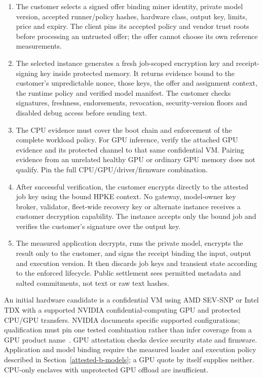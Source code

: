 \begin{enumerate}
\tightlist
\item
  The customer selects a signed offer binding miner identity, private
  model version, accepted runner/policy hashes, hardware class, output
  key, limits, price and expiry. The client pins its accepted policy and
  vendor trust roots before processing an untrusted offer; the offer
  cannot choose its own reference measurements.
\item
  The selected instance generates a fresh job-scoped encryption key and
  receipt-signing key inside protected memory. It returns evidence bound
  to the customer's unpredictable nonce, those keys, the offer and
  assignment context, the runtime policy and verified model manifest.
  The customer checks signatures, freshness, endorsements, revocation,
  security-version floors and disabled debug access before sending text.
\item
  The CPU evidence must cover the boot chain and enforcement of the
  complete workload policy. For GPU inference, verify the attached GPU
  evidence and its protected channel to that same confidential VM.
  Pairing evidence from an unrelated healthy GPU or ordinary GPU memory
  does not qualify. Pin the full CPU/GPU/driver/firmware combination.
\item
  After successful verification, the customer encrypts directly to the
  attested job key using the bound HPKE context. No gateway, model-owner
  key broker, validator, fleet-wide recovery key or alternate instance
  receives a customer decryption capability. The instance accepts only
  the bound job and verifies the customer's signature over the output key.
\item
  The measured application decrypts, runs the private model, encrypts the
  result only to the customer, and signs the receipt binding the input,
  output and execution version. It then discards job keys and transient
  state according to the enforced lifecycle. Public settlement sees
  permitted metadata and salted commitments, not text or raw text hashes.
\end{enumerate}

An initial hardware candidate is a confidential VM using AMD SEV-SNP or
Intel TDX with a supported NVIDIA confidential-computing GPU and protected
CPU/GPU transfers. NVIDIA documents specific supported configurations;
qualification must pin one tested combination rather than infer coverage
from a GPU product name~\cite{nvidiacc}. GPU attestation checks device
security state and firmware. Application and model binding require the
measured loader and execution policy described in
Section~\ref{attested-b-models}; a GPU quote by itself supplies neither.
CPU-only enclaves with unprotected GPU offload are insufficient.

